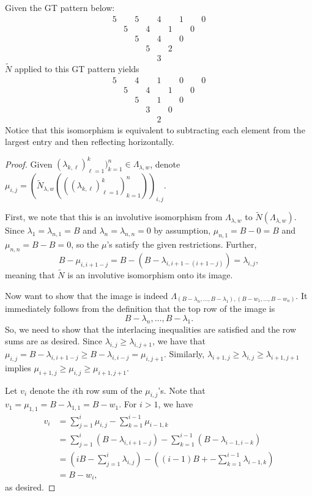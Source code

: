 \documentclass[10pt,a4paper]{amsart}
\begin{document}
\begin{example}
Given the GT pattern below:
\[
\begin{matrix}
5 & & 5 & & 4 & & 1 & & 0\\
&5 & & 4 & & 1 & & 0\\
&&5 & & 4 & & 0\\
&&&5 & & 2\\
&&&&3
\end{matrix}\]
$\tilde{N}$ applied to this GT pattern yields 
\[
\begin{matrix}
5 & & 4 & & 1 & & 0 & & 0 \\
&5 & & 4 & & 1 & & 0 \\
&&5 & & 1 & & 0\\
&&&3 & & 0 \\
&&&&2
\end{matrix}
\]
Notice that this isomorphism is equivalent to subtracting each element from the largest entry and then reflecting horizontally.
\end{example}

\begin{proof}
Given $(\lambda_{k,\ell})_{\ell=1}^k)_{k=1}^n \in 
\Lambda_{\lambda, w}$, denote $\mu_{i,j} = \left(\tilde{N}_{\lambda,w}\left( ((\lambda_{k,\ell})_{\ell=1}^k)_{k=1}^n\right)\right)_{i,j}.$

First, we note that this is an involutive isomorphism from $\Lambda_{\lambda,w}$ to $\tilde{N}\left( \Lambda_{\lambda,w}\right)$.  Since $\lambda_1 = \lambda_{n,1}=B$ and $\lambda_n =\lambda_{n,n}=0$ by assumption, $\mu_{n,1}=B-0=B$ and $\mu_{n,n}=B-B=0$, so the $\mu$'s satisfy the given restrictions.  Further, 
\[
B-\mu_{i,i+1-j} = B-\left(B-\lambda_{i,i+1-(i+1-j)}\right) =\lambda_{i,j},
\]
meaning that $\tilde{N}$ is an involutive isomorphism onto its image.

Now want to show that the image is indeed $\Lambda_{(B-\lambda_n, \hdots, B-\lambda_1),(B-w_1, \hdots, B-w_n)}$. It immediately follows from the definition that the top row of the image is
\[
B-\lambda_n, \hdots, B-\lambda_1.
\]
So, we need to show that the interlacing inequalities are satisfied and the row sums are as desired. Since $\lambda_{i,j} \geq \lambda_{i,j+1}$, we have that $\mu_{i,j} =B- \lambda_{i,i+1-j} \geq B - \lambda_{i,i-j}=\mu_{i,j+1}$. Similarly, $\lambda_{i+1,j} \geq \lambda_{i,j}\geq \lambda_{i+1,j+1}$ implies $\mu_{i+1,j} \geq \mu_{i,j}\geq \mu_{i+1,j+1}$. 

Let $v_i$ denote the $i$th row sum of the $\mu_{i,j}$'s.  Note that $v_1 = \mu_{1,1} = B-\lambda_{1,1} = B-w_1$.  For $i>1$, we have
\begin{align*}
v_i &= \sum_{j=1}^i \mu_{i,j} - \sum_{k=1}^{i-1} \mu_{i-1,k}\\
&= \sum_{j=1}^i (B-\lambda_{i,i+1-j}) - \sum_{k=1}^{i-1} (B-\lambda_{i-1,i-k})\\
&= \left(iB -\sum_{j=1}^i \lambda_{i,j}\right) -\left((i-1)B + -\sum_{k=1}^{i-1} \lambda_{i-1,k} \right)\\
&= B - w_i,
\end{align*}
as desired.
\end{proof}
\end{document}
